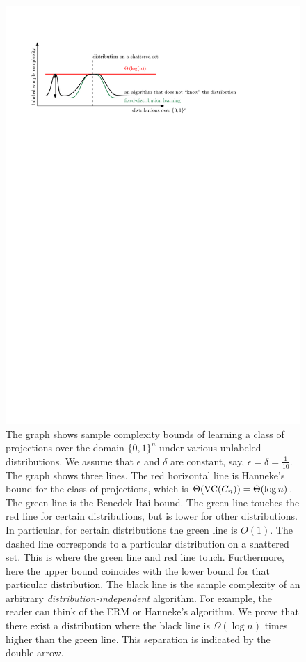 \begin{figure}
\centering
\includegraphics{figure}
\caption{\small The graph shows sample complexity bounds of learning a class of
projections over the domain $\{0,1\}^n$ under various unlabeled distributions.
We assume that $\epsilon$ and $\delta$ are constant, say, $\epsilon = \delta =
\frac{1}{10}$. The graph shows three lines. The red horizontal line is
Hanneke's bound for the class of projections, which is $\Theta(\operatorname{VC}(C_n)) =
\Theta(\log n)$. The green line is the Benedek-Itai bound. The green
line touches the red line for certain distributions, but is lower for other
distributions. In particular, for certain distributions the green line is
$O(1)$. The dashed line corresponds to a particular distribution on a shattered
set. This is where the green line and red line touch. Furthermore, here the
upper bound coincides with the lower bound for that particular distribution. The
black line is the sample complexity of an arbitrary
\emph{distribution-independent} algorithm. For example, the reader can think of
the ERM or Hanneke's algorithm.
We prove that there exist a distribution where the black line is
$\Omega(\log n)$ times higher than the green line. This separation is indicated
by the double arrow.}
\label{figure:sample-complexity}
\end{figure}

